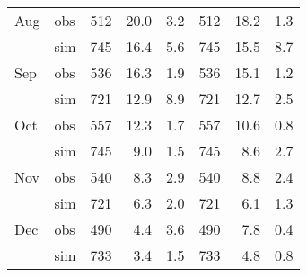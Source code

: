 \begin{table}
\begin{tabular}{|ll|rrr|rrr|}
\small Aug & \small obs & \small 512 & \small 20.0 & \small  3.2 & \small 512 & \small 18.2 & \small 1.3 \\
\small     & \small sim & \small 745 & \small 16.4 & \small  5.6 & \small 745 & \small 15.5 & \small 8.7 \\
\small Sep & \small obs & \small 536 & \small 16.3 & \small  1.9 & \small 536 & \small 15.1 & \small 1.2 \\
\small     & \small sim & \small 721 & \small 12.9 & \small  8.9 & \small 721 & \small 12.7 & \small 2.5 \\
\small Oct & \small obs & \small 557 & \small 12.3 & \small  1.7 & \small 557 & \small 10.6 & \small 0.8 \\
\small     & \small sim & \small 745 & \small  9.0 & \small  1.5 & \small 745 & \small  8.6 & \small 2.7 \\
\small Nov & \small obs & \small 540 & \small  8.3 & \small  2.9 & \small 540 & \small  8.8 & \small 2.4 \\
\small     & \small sim & \small 721 & \small  6.3 & \small  2.0 & \small 721 & \small  6.1 & \small 1.3 \\
\small Dec & \small obs & \small 490 & \small  4.4 & \small  3.6 & \small 490 & \small  7.8 & \small 0.4 \\
\small     & \small sim & \small 733 & \small  3.4 & \small  1.5 & \small 733 & \small  4.8 & \small 0.8 \\
\hline
	\end{tabular}
\end{table}


